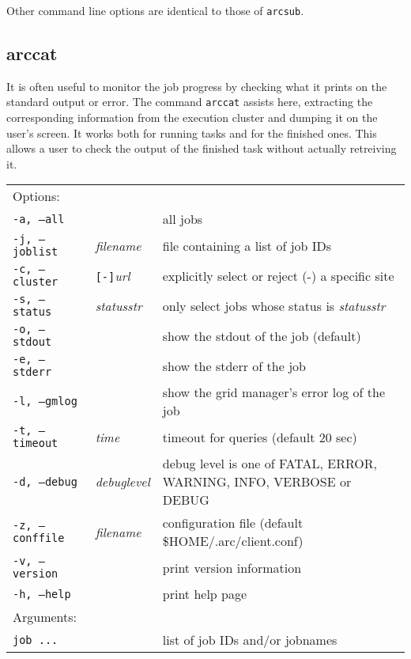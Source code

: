Other command line options are identical to those of \verb#arcsub#.

\subsection{arccat}
\label{sec:arccat}

It is often useful to monitor the job progress by checking what it
prints on the standard output or error. The command \texttt{arccat}
 assists here, extracting the
corresponding information from the execution cluster and dumping it
on the user's screen. It works both for running tasks and for the
finished ones. This allows a user to check the output of the
finished task without actually retreiving it.

\hspace*{0.5cm}
\begin{shaded}
\end{shaded}
\begin{longtable}{llp{8cm}}
   Options:&&\\
   \texttt{-a, --all}& & all jobs\\
   \texttt{-j, --joblist}& \textit{filename} & file containing a list of job IDs\\
   \texttt{-c, --cluster}&\verb#[-]#\textit{url}&explicitly select or reject (-) a specific site\\
   \texttt{-s, --status}& \textit{statusstr} &only select jobs whose status is \textit{statusstr}\\
   \texttt{-o, --stdout}& & show the stdout of the job (default)\\
   \texttt{-e, --stderr}& & show the stderr of the job\\
   \texttt{-l, --gmlog}& & show the grid manager's error log of the job\\
   \texttt{-t, --timeout}& \textit{time} & timeout for queries (default 20 sec)\\
   \texttt{-d, --debug}& \textit{debuglevel}&debug level is one of  FATAL, ERROR, WARNING, INFO, VERBOSE or DEBUG\\
   \texttt{-z, --conffile}&\textit{filename}& configuration file (default {\$}HOME/.arc/client.conf)\\
   \texttt{-v, --version}& & print version information\\
   \texttt{-h, --help}& & print help page\\
   Arguments:&&\\
   \texttt{job ...} && list of job IDs and/or jobnames\\
\end{longtable}

